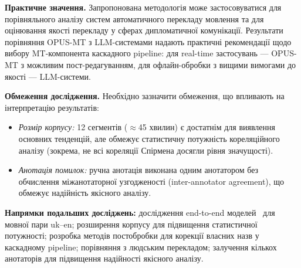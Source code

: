 \textbf{Практичне значення.} Запропонована методологія може застосовуватися
для порівняльного аналізу систем автоматичного перекладу мовлення та для
оцінювання якості перекладу у сферах дипломатичної комунікації. Результати
порівняння OPUS-MT з LLM-системами надають практичні рекомендації щодо вибору
MT-компонента каскадного pipeline: для real-time застосувань --- OPUS-MT з
можливим пост-редагуванням, для офлайн-обробки з вищими вимогами до
якості --- LLM-системи.

\textbf{Обмеження дослідження.} Необхідно зазначити обмеження, що впливають
на інтерпретацію результатів:
\begin{itemize}[nosep]
    \item \textit{Розмір корпусу:} 12 сегментів ($\approx$45 хвилин) є
    достатнім для виявлення основних тенденцій, але обмежує статистичну
    потужність кореляційного аналізу (зокрема, не всі кореляції Спірмена
    досягли рівня значущості).
    \item \textit{Анотація помилок:} ручна анотація виконана одним
    анотатором без обчислення міжанотаторної узгодженості
    (inter-annotator agreement), що обмежує надійність якісного аналізу.
\end{itemize}

\textbf{Напрямки подальших досліджень:} дослідження end-to-end
моделей~\cite{seamlessm4t} для мовної пари uk--en; розширення корпусу
для підвищення статистичної потужності; розробка методів постобробки для
корекції власних назв у каскадному pipeline; порівняння з людським
перекладом; залучення кількох анотаторів для підвищення
надійності якісного аналізу.

\clearpage
